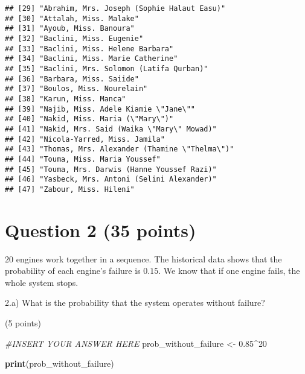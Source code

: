 \documentclass[
]{article}
\newenvironment{Shaded}{\begin{snugshade}}{\end{snugshade}}
\newcommand{\CommentTok}[1]{\textcolor[rgb]{0.56,0.35,0.01}{\textit{#1}}}
\newcommand{\DecValTok}[1]{\textcolor[rgb]{0.00,0.00,0.81}{#1}}
\newcommand{\FloatTok}[1]{\textcolor[rgb]{0.00,0.00,0.81}{#1}}
\newcommand{\FunctionTok}[1]{\textcolor[rgb]{0.13,0.29,0.53}{\textbf{#1}}}
\newcommand{\NormalTok}[1]{#1}
\newcommand{\OtherTok}[1]{\textcolor[rgb]{0.56,0.35,0.01}{#1}}
\newcommand{\SpecialCharTok}[1]{\textcolor[rgb]{0.81,0.36,0.00}{\textbf{#1}}}
\begin{document}
\begin{verbatim}
## [29] "Abrahim, Mrs. Joseph (Sophie Halaut Easu)"                                         
## [30] "Attalah, Miss. Malake"                                                             
## [31] "Ayoub, Miss. Banoura"                                                              
## [32] "Baclini, Miss. Eugenie"                                                            
## [33] "Baclini, Miss. Helene Barbara"                                                     
## [34] "Baclini, Miss. Marie Catherine"                                                    
## [35] "Baclini, Mrs. Solomon (Latifa Qurban)"                                             
## [36] "Barbara, Miss. Saiide"                                                             
## [37] "Boulos, Miss. Nourelain"                                                           
## [38] "Karun, Miss. Manca"                                                                
## [39] "Najib, Miss. Adele Kiamie \"Jane\""                                                
## [40] "Nakid, Miss. Maria (\"Mary\")"                                                     
## [41] "Nakid, Mrs. Said (Waika \"Mary\" Mowad)"                                           
## [42] "Nicola-Yarred, Miss. Jamila"                                                       
## [43] "Thomas, Mrs. Alexander (Thamine \"Thelma\")"                                       
## [44] "Touma, Miss. Maria Youssef"                                                        
## [45] "Touma, Mrs. Darwis (Hanne Youssef Razi)"                                           
## [46] "Yasbeck, Mrs. Antoni (Selini Alexander)"                                           
## [47] "Zabour, Miss. Hileni"
\end{verbatim}

\hypertarget{question-2-35-points}{%
\section{Question 2 (35 points)}\label{question-2-35-points}}

\(20\) engines work together in a sequence. The historical data shows
that the probability of each engine's failure is \(0.15\). We know that
if one engine fails, the whole system stops.

2.a) What is the probability that the system operates without failure?

(5 points)

\begin{Shaded}
\begin{Highlighting}[]
\CommentTok{\#INSERT YOUR ANSWER HERE}
\NormalTok{prob\_without\_failure }\OtherTok{\textless{}{-}} \FloatTok{0.85}\SpecialCharTok{\^{}}\DecValTok{20}

\FunctionTok{print}\NormalTok{(prob\_without\_failure)}
\end{Highlighting}
\end{Shaded}
\end{document}
